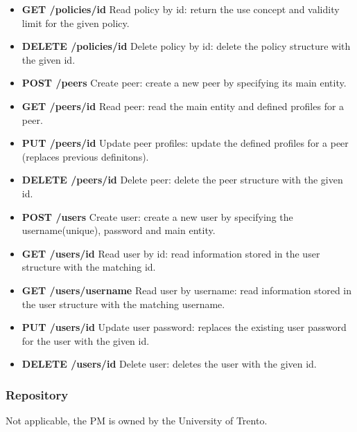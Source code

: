 \begin{itemize}
\item {\bf GET /policies/id} Read policy by id: return the use concept and validity limit for the given policy.
\item {\bf DELETE /policies/id} Delete policy by id: delete the policy structure with the given id.		
\item {\bf POST /peers}	Create peer: create a new peer by specifying its main entity.			
\item {\bf GET /peers/id} Read peer: read the main entity and defined profiles for a peer.
\item {\bf PUT /peers/id} Update peer profiles: update the defined profiles for a peer (replaces previous definitons).
\item {\bf DELETE /peers/id} Delete peer: delete the peer structure with the given id.
\item {\bf POST /users}	Create user: create a new user by specifying the username(unique), password and main entity.											
\item {\bf GET /users/id} Read user by id: read information stored in the user structure with the matching id.											
\item {\bf GET /users/username}	Read user by username: read information stored in the user structure with the matching username.										
\item {\bf PUT /users/id} Update user password: replaces the existing user password for the user with the given id.	
\item {\bf DELETE /users/id} Delete user: deletes the user with the given id.
\end{itemize}
\subsubsection{Repository}
Not applicable, the PM is owned by the University of Trento. 